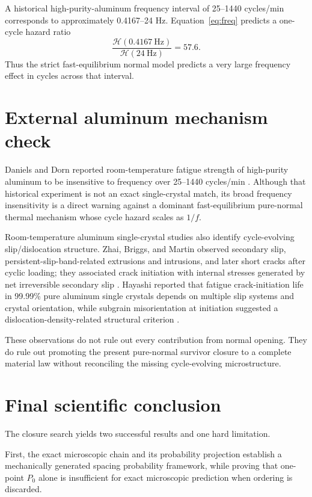 \documentclass[11pt]{article}
\begin{document}
A historical high-purity-aluminum frequency interval of 25--1440 cycles/min corresponds to approximately 0.4167--24 Hz. Equation~\eqref{eq:freq} predicts a one-cycle hazard ratio
\begin{equation}
\frac{\mathcal H(0.4167\ \mathrm{Hz})}{\mathcal H(24\ \mathrm{Hz})}=57.6.
\end{equation}
Thus the strict fast-equilibrium normal model predicts a very large frequency effect in cycles across that interval.

\section{External aluminum mechanism check}
Daniels and Dorn reported room-temperature fatigue strength of high-purity aluminum to be insensitive to frequency over 25--1440 cycles/min \cite{DanielsDorn1957}. Although that historical experiment is not an exact single-crystal match, its broad frequency insensitivity is a direct warning against a dominant fast-equilibrium pure-normal thermal mechanism whose cycle hazard scales as $1/f$.

Room-temperature aluminum single-crystal studies also identify cycle-evolving slip/dislocation structure. Zhai, Briggs, and Martin observed secondary slip, persistent-slip-band-related extrusions and intrusions, and later short cracks after cyclic loading; they associated crack initiation with internal stresses generated by net irreversible secondary slip \cite{Zhai1996}. Hayashi reported that fatigue crack-initiation life in 99.99\% pure aluminum single crystals depends on multiple slip systems and crystal orientation, while subgrain misorientation at initiation suggested a dislocation-density-related structural criterion \cite{Hayashi2022}.

These observations do not rule out every contribution from normal opening. They do rule out promoting the present pure-normal survivor closure to a complete material law without reconciling the missing cycle-evolving microstructure.

\section{Final scientific conclusion}
The closure search yields two successful results and one hard limitation.

First, the exact microscopic chain and its probability projection establish a mechanically generated spacing probability framework, while proving that one-point $P_0$ alone is insufficient for exact microscopic prediction when ordering is discarded.
\end{document}
